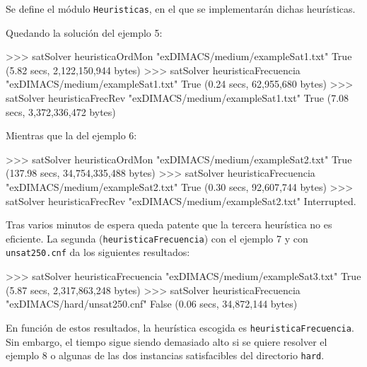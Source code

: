 Se define el módulo \texttt{Heuristicas}, en el que se implementarán dichas heurísticas.


\newpage

Quedando la solución del ejemplo 5:

\begin{code}
>>> satSolver heuristicaOrdMon "exDIMACS/medium/exampleSat1.txt"
True
(5.82 secs, 2,122,150,944 bytes)
>>> satSolver heuristicaFrecuencia "exDIMACS/medium/exampleSat1.txt"
True
(0.24 secs, 62,955,680 bytes)
>>> satSolver heuristicaFrecRev "exDIMACS/medium/exampleSat1.txt"
True
(7.08 secs, 3,372,336,472 bytes)
\end{code}

Mientras que la del ejemplo 6:

\begin{code}
>>> satSolver heuristicaOrdMon "exDIMACS/medium/exampleSat2.txt"
True
(137.98 secs, 34,754,335,488 bytes)
>>> satSolver heuristicaFrecuencia "exDIMACS/medium/exampleSat2.txt"
True
(0.30 secs, 92,607,744 bytes)
>>> satSolver heuristicaFrecRev "exDIMACS/medium/exampleSat2.txt"
Interrupted.
\end{code}

Tras varios minutos de espera queda patente que la tercera heurística no es eficiente.  La segunda (\texttt{heuristicaFrecuencia}) con el ejemplo 7 y con \texttt{unsat250.cnf} da los siguientes resultados:

\begin{code}
>>> satSolver heuristicaFrecuencia "exDIMACS/medium/exampleSat3.txt"
True
(5.87 secs, 2,317,863,248 bytes)
>>> satSolver heuristicaFrecuencia "exDIMACS/hard/unsat250.cnf"
False
(0.06 secs, 34,872,144 bytes)
\end{code}

En función de estos resultados, la heurística escogida es \texttt{heuristicaFrecuencia}. Sin embargo, el tiempo sigue siendo demasiado alto si se quiere resolver el ejemplo 8 o algunas de las dos instancias satisfacibles del directorio \texttt{hard}.